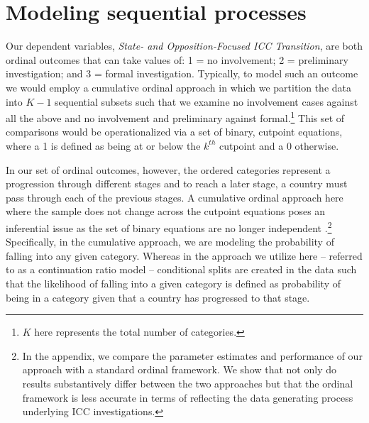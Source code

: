 
\section*{Modeling sequential processes}

Our dependent variables, \emph{State- and Opposition-Focused ICC Transition}, are both ordinal outcomes that can take values of: 1 = no involvement; 2 = preliminary investigation; and 3 = formal investigation. Typically, to model such an outcome we would employ a cumulative ordinal approach in which we partition the data into $K-1$ sequential subsets such that we examine no involvement cases against all the above and no involvement and preliminary against formal.\footnote{$K$ here represents the total number of categories.} This set of comparisons would be operationalized via a set of binary, cutpoint equations, where a 1 is defined as being at or below the $k^{th}$ cutpoint and a 0 otherwise.

In our set of ordinal outcomes, however, the ordered categories represent a progression through different stages and to reach a later stage, a country must pass through each of the previous stages. A cumulative ordinal approach here where the sample does not change across the cutpoint equations poses an inferential issue as the set of binary equations are no longer independent \citep{tutz1990sequential, have:uttal:1994, fienberg2007analysis, agresti:2010}.\footnote{In the appendix, we compare the parameter estimates and performance of our approach with a standard ordinal framework. We show that not only do results substantively differ between the two approaches but that the ordinal framework is less accurate in terms of reflecting the data generating process underlying ICC investigations.} Specifically, in the cumulative approach, we are modeling the probability of falling into any given category. Whereas in the approach we utilize here -- referred to as a continuation ratio model -- conditional splits are created in the data such that the likelihood of falling into a given category is defined as probability of being in a category given that a country has progressed to that stage.

